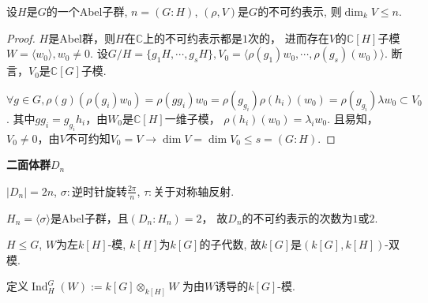 \begin{proposition}
    设$H$是$G$的一个Abel子群, $n=(G:H)$, 
    $(\rho,V)$是$G$的不可约表示, 则$\dim_kV\leq n$.
\end{proposition}

\begin{proof}
	$H$是Abel群，则$H$在$\mathbb C$上的不可约表示都是$1$次的，
    进而存在$V$的$\mathbb C[H]$子模$W=\langle w_0\rangle,w_0\neq 0. $
	设$G/H=\{g_1H,\cdots ,g_sH\},V_0
    =\langle \rho(g_1)w_0,\cdots,\rho(g_s)(w_0)\rangle$.
    断言，$V_0$是$\mathbb C[G]$子模.
	
	$\forall g\in G,\rho(g)(\rho(g_i)w_0)=\rho(gg_i)w_0
    =\rho(g_{g_i})\rho(h_i)(w_0)=\rho(g_{g_i})\lambda w_0\subset V_0$.
    其中$gg_i=g_{g_i}h_i$，由$W_0$是$\mathbb C[H]$一维子模，
    $\rho(h_i)(w_0)=\lambda_iw_0$.
    且易知，$V_0\neq0$，由$V$不可约知$V_0=V
    \rightarrow \dim V=\dim V_0\leq s=(G:H)$.
\end{proof}

\begin{example} \textbf{二面体群$D_n$}\par
    \qquad $|D_n|=2n$, $\sigma:$逆时针旋转$\frac{2\pi}{n}$, 
    $\tau:$关于对称轴反射.\par
    \qquad $H_n=\langle\sigma\rangle$是Abel子群，且$(D_n:H_n)=2$，
    故$D_n$的不可约表示的次数为$1$或$2$.
\end{example}


\begin{definition}
    $H\leq G$, $W$为左$k[H]$-模, $k[H]$为$k[G]$的子代数, 
    故$k[G]$是$(k[G],k[H])$-双模.\par
    \qquad 定义$\operatorname{Ind}_H^G(W):=k[G]\otimes_{k[H]}W$
    为由$W$诱导的$k[G]$-模.
\end{definition}

